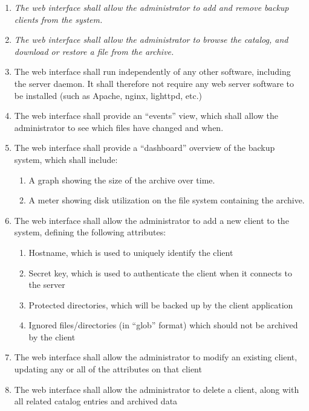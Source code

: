 \begin{enumerate}
    \item \emph{The web interface shall allow the administrator to add and
        remove backup clients from the system.}
    \item \emph{The web interface shall allow the administrator to browse the
        catalog, and download or restore a file from the archive.}
    \item The web interface shall run independently of any other software,
        including the server daemon. It shall therefore not require any web
        server software to be installed (such as Apache, nginx, lighttpd, etc.)
    \item The web interface shall provide an ``events'' view, which shall allow
        the administrator to see which files have changed and when.
    \item The web interface shall provide a ``dashboard'' overview of the
        backup system, which shall include:
        \begin{enumerate}
            \item A graph showing the size of the archive over time.
            \item A meter showing disk utilization on the file system
                containing the archive.
        \end{enumerate}
    \item The web interface shall allow the administrator to add a new client
        to the system, defining the following attributes:
        \begin{enumerate}
            \item Hostname, which is used to uniquely identify the client
            \item Secret key, which is used to authenticate the client when it
                connects to the server
            \item Protected directories, which will be backed up by the client
                application
            \item Ignored files/directories (in ``glob'' format) which should
                not be archived by the client
        \end{enumerate}
    \item The web interface shall allow the administrator to modify an existing
        client, updating any or all of the attributes on that client
    \item The web interface shall allow the administrator to delete a client,
        along with all related catalog entries and archived data

\end{enumerate}
